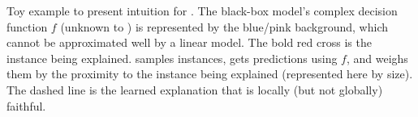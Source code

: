 \cite{Ribeiro0G16}
Toy example to present intuition for \lime{}.
The black-box model’s complex decision function $f$ (unknown to \lime{}) is represented by the blue/pink background, which cannot be approximated well by a linear model.
The bold red cross is the instance being explained.
\lime{} samples instances, gets predictions using $f$, and weighs them by the proximity to the instance being explained (represented here by size).
The dashed line is the learned explanation that is locally (but not globally) faithful.
